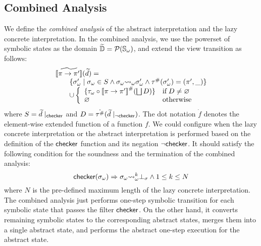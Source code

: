 \subsection{Combined Analysis}

We define the \textit{combined analysis} of the abstract interpretation and the
lazy concrete interpretation.  In the combined analysis, we use the powerset of
symbolic states as the domain $\widetilde{\mathbb{D}} = \mathcal{P}({\mathbb{S}}_\omega)$, and extend the
view transition as follows:
\[
  \begin{array}{l}
    [\![{\widetilde{\pi \rightarrow \pi'}}]\!](\widetilde{d}) =\\
    \qquad \{
      {\sigma}_\omega' \mid {\sigma}_\omega \in S \wedge
      {\sigma}_\omega {\leadsto}_\omega {\sigma}_\omega' \wedge
      {\tau}^{\#}({\sigma}_\omega') = (\pi', \_)
    \}\\
    \qquad \cup \left\{
    \begin{array}{ll}
      \{ {\tau}_\omega \circ {[\![{\pi\rightarrow \pi'}]\!]}^{\#}(\bigsqcup D) \}
      & \text{if} \; D \neq \varnothing\\
      \varnothing & \text{otherwise}\\
    \end{array}
    \right.
  \end{array}
\]
where $S = \widetilde{d}\mid_{\textsf{checker}}$ and $D =
\dot{{\tau}^{\#}}(\widetilde{d}\mid_{\neg\textsf{checker}})$.  The dot notation $\dot{f}$
denotes the element-wise extended function of a function $f$.  We could
configure when the lazy concrete interpretation or the abstract interpretation
is performed based on the definition of the $\textsf{checker}$ function and its negation
$\neg\textsf{checker}$.  It should satisfy the following condition for the soundness and
the termination of the combined analysis:
\[
  \textsf{checker}({\sigma}_\omega) \Rightarrow {\sigma}_\omega {\leadsto}_\omega^k \bot_\sigma \wedge
  1 \leq k \leq N
\]
where $N$ is the pre-defined maximum length of the lazy concrete interpretation.
The combined analysis just performs one-step symbolic transition for each
symbolic state that passes the filter $\textsf{checker}$. On the other hand, it converts
remaining symbolic states to the corresponding abstract states, merges them into
a single abstract state, and performs the abstract one-step execution for the
abstract state.


